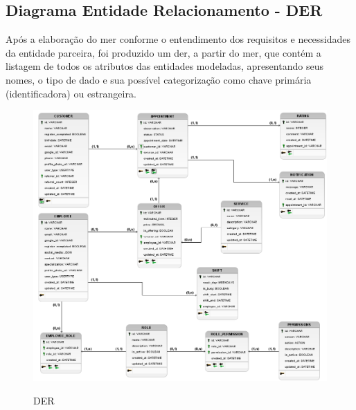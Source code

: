 \subsection{Diagrama Entidade Relacionamento - DER}
Após a elaboração do \gls{mer} conforme o entendimento dos requisitos e necessidades da entidade parceira, foi produzido um \gls{der}, a partir do \gls{mer}, que contém a listagem de todos os atributos das entidades modeladas, apresentando seus nomes, o tipo de dado e sua possível categorização como chave primária (identificadora) ou estrangeira.
\begin{figure}[h!tbp]
	\centering
	\caption{DER}
	\includegraphics[width=1\textwidth]{cap04-desenvolvimento/images/4-7-2-diagrama-entidade-relacionamento.png}
	\label{fig:der}
\end{figure}
